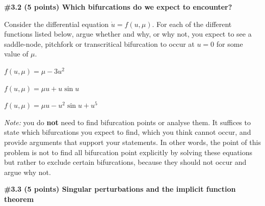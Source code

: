 \documentclass[10pt]{article}
\begin{document}
\underline{\hspace*{\textwidth}}


\textbf{\#3.2 (5 points) Which bifurcations do we expect to encounter?}

Consider the differential equation $\dot{u}=f(u,\mu)$. For each of the different functions listed below, argue whether and why, or why not, you expect to see a saddle-node, pitchfork or transcritical bifurcation to occur at $u=0$ for some value of $\mu$.
\begin{compactenum}[(i)]
    \item $f(u,\mu) = \mu-3u^2$
    \item $f(u,\mu) = \mu u+u\sin u$
    \item $f(u,\mu) = \mu u - u^2\sin u+u^5$
\end{compactenum}
\emph{Note:} you do \textbf{not} need to find bifurcation points or analyse them. It suffices to state which bifurcations you expect to find, which you think cannot occur, and provide arguments that support your statements. In other words, the point of this problem is not to find all bifurcation point explicitly by solving these equations but rather to exclude certain bifurcations, because they should not occur and argue why not.

\underline{\hspace*{\textwidth}}


\textbf{\#3.3 (5 points) Singular perturbations and the implicit function theorem}
\end{document}
